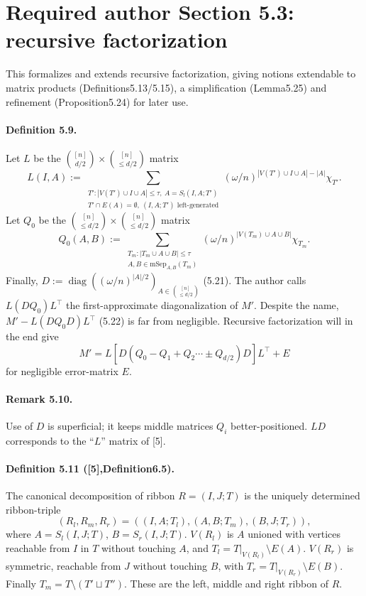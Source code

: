 \documentclass[10pt,a4paper]{article}
\begin{document}
\section*{Required author Section 5.3: recursive factorization}
This formalizes and extends recursive factorization, giving notions extendable to matrix products (Definitions5.13/5.15), a simplification (Lemma5.25) and refinement (Proposition5.24) for later use.
\paragraph{Definition 5.9.} Let $L$ be the $\binom{[n]}{d/2}\times\binom{[n]}{\le d/2}$ matrix
\[L(I,A):=\sum_{\substack{T':|V(T')\cup I\cup A|\le\tau,\ A=S_l(I,A;T')\\T'\cap E(A)=\emptyset,\ (I,A;T')\text{ left-generated}}}(\omega/n)^{|V(T')\cup I\cup A|-|A|}\chi_{T'}.\tag{5.19}\]
Let $Q_0$ be the $\binom{[n]}{\le d/2}\times\binom{[n]}{\le d/2}$ matrix
\[Q_0(A,B):=\sum_{\substack{T_m:|T_m\cup A\cup B|\le\tau\\A,B\in\mathrm{mSep}_{A,B}(T_m)}}(\omega/n)^{|V(T_m)\cup A\cup B|}\chi_{T_m}.\tag{5.20}\]
Finally, $D:=\operatorname{diag}((\omega/n)^{|A|/2})_{A\in\binom{[n]}{\le d/2}}$ (5.21). The author calls $L(DQ_0)L^\top$ the first-approximate diagonalization of $M'$. Despite the name, $M'-L(DQ_0D)L^\top$ (5.22) is far from negligible. Recursive factorization will in the end give
\[M'=L[D(Q_0-Q_1+Q_2\cdots\pm Q_{d/2})D]L^\top+E\tag{5.23}\]
for negligible error-matrix $E$.
\paragraph{Remark 5.10.} Use of $D$ is superficial; it keeps middle matrices $Q_i$ better-positioned. $LD$ corresponds to the ``$L$'' matrix of [5].
\paragraph{Definition 5.11 ([5],Definition6.5).} The canonical decomposition of ribbon $R=(I,J;T)$ is the uniquely determined ribbon-triple
\[(R_l,R_m,R_r)=((I,A;T_l),(A,B;T_m),(B,J;T_r)),\]
where $A=S_l(I,J;T)$, $B=S_r(I,J;T)$. $V(R_l)$ is $A$ unioned with vertices reachable from $I$ in $T$ without touching $A$, and $T_l=T|_{V(R_l)}\setminus E(A)$. $V(R_r)$ is symmetric, reachable from $J$ without touching $B$, with $T_r=T|_{V(R_r)}\setminus E(B)$. Finally $T_m=T\setminus(T'\sqcup T'')$. These are the left, middle and right ribbon of $R$.
\end{document}
